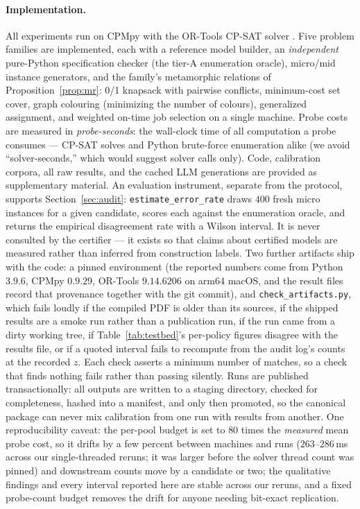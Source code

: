 \documentclass[pdflatex,sn-mathphys-num]{sn-jnl}
\theoremstyle{thmstyleone}
\theoremstyle{thmstyletwo}
\begin{document}
\paragraph{Implementation.}
All experiments run on CPMpy \cite{guns2019cpmpy} with the OR-Tools
CP-SAT solver \cite{ortools}. Five problem families are implemented,
each with a reference model builder, an \emph{independent}
pure-Python specification checker (the tier-A enumeration oracle),
micro/mid instance generators, and the family's metamorphic relations
of Proposition~\ref{prop:mr}: 0/1 knapsack with pairwise conflicts,
minimum-cost set cover, graph colouring (minimizing the number of
colours), generalized assignment, and weighted on-time job selection
on a single machine. Probe costs are measured in \emph{probe-seconds}:
the wall-clock time of all computation a probe consumes --- CP-SAT
solves and Python brute-force enumeration alike (we avoid
``solver-seconds,'' which would suggest solver calls only). Code,
calibration corpora, all raw results, and the cached LLM generations
are provided as supplementary material. An evaluation instrument, separate from the protocol, supports
Section~\ref{sec:audit}: \texttt{estimate\_error\_rate} draws $400$
fresh micro instances for a given candidate, scores each against the
enumeration oracle, and returns the empirical disagreement rate with
a Wilson interval. It is never consulted by the certifier --- it
exists so that claims about certified models are measured rather than
inferred from construction labels. Two further artifacts ship with
the code: a pinned environment (the reported numbers come from Python
$3.9.6$, CPMpy $0.9.29$, OR-Tools $9.14.6206$ on arm64 macOS, and the
result files record that provenance together with the git commit),
and \texttt{check\_artifacts.py}, which fails loudly if the compiled
PDF is older than its sources, if the shipped results are a smoke run
rather than a publication run, if the run came from a dirty working
tree, if Table~\ref{tab:testbed}'s per-policy figures disagree with
the results file, or if a quoted interval fails to recompute from the
audit log's counts at the recorded $z$. Each check asserts a minimum
number of matches, so a check that finds nothing fails rather than
passing silently. Runs are published transactionally: all outputs are
written to a staging directory, checked for completeness, hashed into
a manifest, and only then promoted, so the canonical package can
never mix calibration from one run with results from another. One reproducibility caveat:
the per-pool budget is set to $80$ times the \emph{measured} mean
probe cost, so it drifts by a few percent between machines and runs
($263$--$286$\,ms across our single-threaded reruns; it was larger before the solver thread count was pinned) and downstream counts move by a candidate
or two; the qualitative findings and every interval reported here are
stable across our reruns, and a fixed probe-count budget removes the
drift for anyone needing bit-exact replication.
\end{document}
